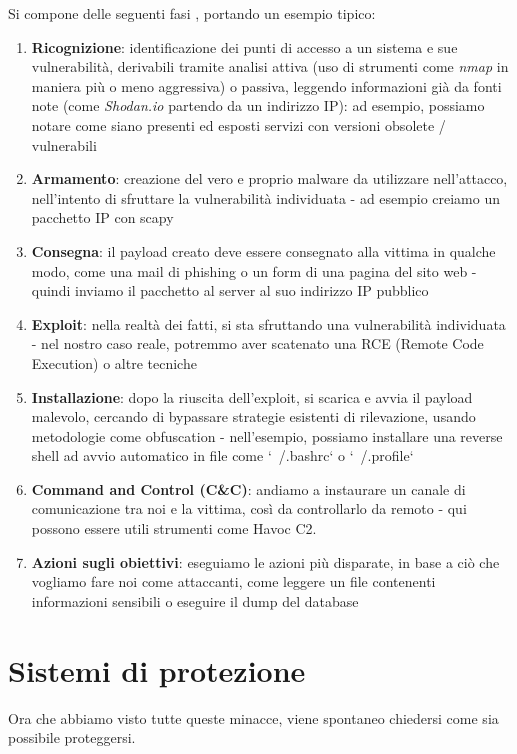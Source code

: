 Si compone delle seguenti fasi \cite{cyber_kill_chain_360}, portando un esempio tipico:
\begin{enumerate}
    \item \textbf{Ricognizione}: identificazione dei punti di accesso a un sistema e sue vulnerabilità, derivabili tramite analisi attiva (uso di strumenti come \emph{nmap} in maniera più o meno aggressiva) o passiva, leggendo informazioni già da fonti note (come \emph{Shodan.io} partendo da un indirizzo IP): ad esempio, possiamo notare come siano presenti ed esposti servizi con versioni obsolete / vulnerabili
    
    \item \textbf{Armamento}: creazione del vero e proprio malware da utilizzare nell'attacco, nell'intento di sfruttare la vulnerabilità individuata - ad esempio creiamo un pacchetto IP con scapy

    \item \textbf{Consegna}: il payload creato deve essere consegnato alla vittima in qualche modo, come una mail di phishing o un form di una pagina del sito web - quindi inviamo il pacchetto al server al suo indirizzo IP pubblico

    \item \textbf{Exploit}: nella realtà dei fatti, si sta sfruttando una vulnerabilità individuata - nel nostro caso reale, potremmo aver scatenato una RCE (Remote Code Execution) o altre tecniche

    \item \textbf{Installazione}: dopo la riuscita dell'exploit, si scarica e avvia il payload malevolo, cercando di bypassare strategie esistenti di rilevazione, usando metodologie come obfuscation - nell'esempio, possiamo installare una reverse shell ad avvio automatico in file come `~/.bashrc` o `~/.profile`

    \item \textbf{Command and Control (C\&C)}: andiamo a instaurare un canale di comunicazione tra noi e la vittima, così da controllarlo da remoto - qui possono essere utili strumenti come Havoc C2.

    \item \textbf{Azioni sugli obiettivi}: eseguiamo le azioni più disparate, in base a ciò che vogliamo fare noi come attaccanti, come leggere un file contenenti informazioni sensibili o eseguire il dump del database
\end{enumerate}

\section{Sistemi di protezione}
Ora che abbiamo visto tutte queste minacce, viene spontaneo chiedersi come sia possibile proteggersi.

